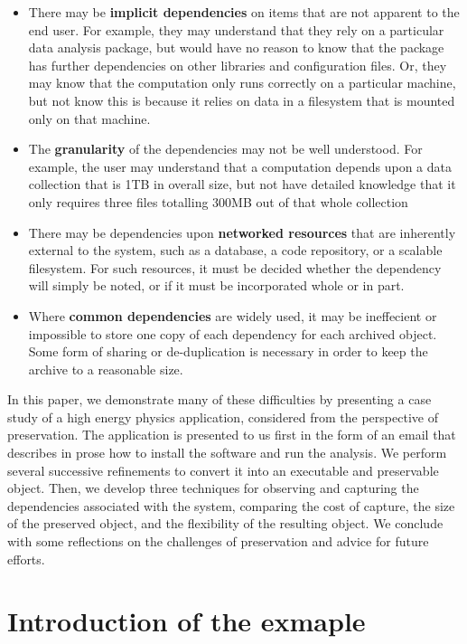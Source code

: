 \documentclass{acm_proc_article-sp}
\begin{document}
\begin{itemize}
\item There may be {\bf implicit dependencies} on items that are
not apparent to the end user.  For example, they may understand that
they rely on a particular data analysis package, but would have
no reason to know that the package has further dependencies on
other libraries and configuration files.  Or, they may know that
the computation only runs correctly on a particular machine, but
not know this is because it relies on data in a filesystem that
is mounted only on that machine.

\item The {\bf granularity} of the dependencies may not be well understood.
For example, the user may understand that a computation depends upon
a data collection that is 1TB in overall size, but not have detailed
knowledge that it only requires three files totalling 300MB out of that
whole collection

\item There may be dependencies upon {\bf networked resources} that
are inherently external to the system, such as a database, a code
repository, or a scalable filesystem.  For such resources, it
must be decided whether the dependency will simply be noted, or if it
must be incorporated whole or in part.

\item Where {\bf common dependencies} are widely used, it may be ineffecient or
impossible to store one copy of each dependency for each archived object.
Some form of sharing or de-duplication is necessary in order to keep
the archive to a reasonable size.
\end{itemize}

In this paper, we demonstrate many of these difficulties by presenting
a case study of a high energy physics application, considered from
the perspective of preservation.  The application is presented to us
first in the form of an email that describes in prose how to install
the software and run the analysis.  We perform several successive
refinements to convert it into an executable and preservable object.
Then, we develop three techniques for observing and capturing the
dependencies associated with the system, comparing the cost of capture,
the size of the preserved object, and the flexibility of the resulting
object.  We conclude with some reflections on the challenges of preservation
and advice for future efforts.

\section{Introduction of the exmaple} 
\end{document}
